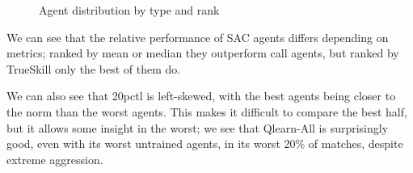 \begin{figure}[H]
{}
\caption{Agent distribution by type and rank}
\label{AgentTypeDistribution}
\end{figure}

We can see that the relative performance of SAC agents differs depending on metrics; ranked by mean or median they outperform call agents, but ranked by TrueSkill only the best of them do.

We can also see that 20pctl is left-skewed, with the best agents being closer to the norm than the worst agents. This makes it difficult to compare the best half, but it allows some insight in the worst; we see that Qlearn-All is surprisingly good, even with its worst untrained agents, in its worst 20\% of matches, despite extreme aggression.

